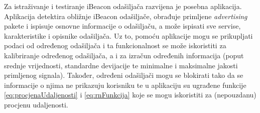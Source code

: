 Za istraživanje i testiranje iBeacon odašiljača razvijena je posebna aplikacija. 
Aplikacija detektira obližnje iBeacon odašiljače, obrađuje primljene \textit{advertising} pakete i ispisuje osnovne informacije o odašiljaču, a može ispisati sve servise, karakteristike i opisnike odašiljača. 
Uz to, pomoću aplikacije mogu se prikupljati podaci od određenog odašiljača i ta funkcionalnost se može iskoristiti za kalibriranje određenog odašiljača, a i za izračun određenih informacija (poput srednje vrijednosti, standardne devijacije te minimalne i maksimalne jakosti primljenog signala). 
Također, određeni odašiljači mogu se blokirati tako da se informacije o njima ne prikazuju korisniku te u aplikaciju su ugrađene funkcije \eqref{eq:procjenaUdaljenosti} i \eqref{eq:rnFunkcija} koje se mogu iskoristiti za (nepouzdanu) procjenu udaljenosti.

